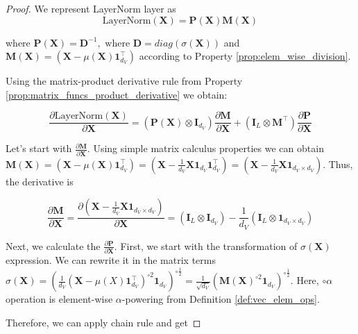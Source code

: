 \documentclass{article}
\begin{document}
\begin{proof}
We represent LayerNorm layer as
\begin{equation*}
    \text{LayerNorm}(\mathbf{X}) = \mathbf{P}(\mathbf{X})\mathbf{M}(\mathbf{X})
\end{equation*}

where $\mathbf{P}(\mathbf{X}) = \mathbf{D}^{-1}, \text{ where } \mathbf{D} = \textit{diag}(\sigma(\mathbf{X}))$ and $\mathbf{M}(\mathbf{X}) = (\mathbf{X} - \mu(\mathbf{X})\mathbf{1}^\top_{d_V})$ according to Property \ref{prop:elem_wise_division}.

Using the matrix-product derivative rule from Property \ref{prop:matrix_funcs_product_derivative} we obtain:

\begin{equation*}
    \frac{\partial\text{LayerNorm}(\mathbf{X})}{\partial \mathbf{X}} = ( \mathbf{P}(\mathbf{X}) \otimes \mathbf{I}_{d_V}) \frac{\partial \mathbf{M}}{\partial \mathbf{X}} + (\mathbf{I}_L\otimes \mathbf{M}^\top)\frac{\partial \mathbf{P}}{\partial \mathbf{X}}
\end{equation*}

Let's start with $\frac{\partial \mathbf{M}}{\partial \mathbf{X}}$. Using simple matrix calculus properties we can obtain $\mathbf{M}(\mathbf{X}) = (\mathbf{X} - \mu(\mathbf{X}) \mathbf{1}^{\top}_{d_V}) = (\mathbf{X} - \frac{1}{d_V}\mathbf{X} \mathbf{1}_{d_V} \mathbf{1}^{\top}_{d_V}) = (\mathbf{X} - \frac{1}{d_V}\mathbf{X} \mathbf{1}_{d_V \times d_V})$. Thus, the derivative is

\begin{equation*}
   \frac{\partial \mathbf{M}}{\partial \mathbf{X}} = \frac{\partial  (\mathbf{X} - \frac{1}{d_V}\mathbf{X} \mathbf{1}_{d_V \times d_V})}{\partial \mathbf{X}} = (\mathbf{I}_L \otimes \mathbf{I}_{d_V}) - \frac{1}{d_V}(\mathbf{I}_L \otimes \mathbf{1}_{d_V \times d_V})
\end{equation*}

Next, we calculate the $\frac{\partial \mathbf{P}}{\partial \mathbf{X}}$. First, we start with the transformation of $\sigma(\mathbf{X})$ expression. We can rewrite it in the matrix terms $\sigma(\mathbf{X}) = (\frac{1}{d_V} (\mathbf{X} - \mu(X)\mathbf{1}_{d_V}^\top)^{\circ 2} \mathbf{1}_{d_V})^{\circ \frac{1}{2}} = \frac{1}{\sqrt{d_V}} \left(\mathbf{M}(\mathbf{X})^{\circ 2} \mathbf{1}_{d_V}\right)^{\circ{\frac{1}{2}}}$. Here, $\circ \alpha$ operation is element-wise $\alpha$-powering from Definition \ref{def:vec_elem_ops}.

Therefore, we can apply chain rule and get


\end{proof}
\end{document}
